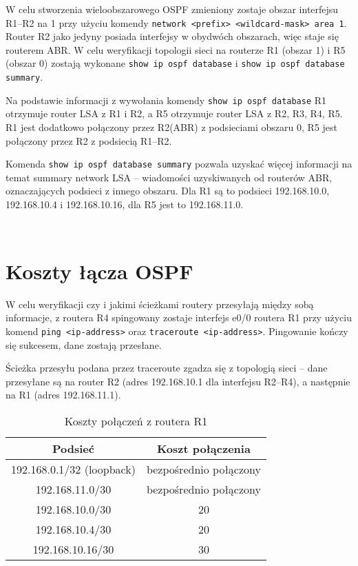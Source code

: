 \documentclass[a4paper,12pt,notitlepage]{article}
\begin{document}
W celu stworzenia wieloobszarowego OSPF zmieniony zostaje obszar interfejsu R1--R2 na 1 przy użyciu komendy \texttt{network <prefix> <wildcard-mask> area 1}. Router R2 jako jedyny posiada interfejsy w obydwóch obszarach, więc staje się routerem ABR. W celu weryfikacji topologii sieci na routerze R1 (obszar 1) i R5 (obszar 0) zostają wykonane \texttt{show ip ospf database} i \texttt{show ip ospf database summary}.

Na podstawie informacji z wywołania komendy \texttt{show ip ospf database} R1 otrzymuje router LSA z R1 i R2, a R5 otrzymuje router LSA z R2, R3, R4, R5. R1 jest dodatkowo połączony przez R2(ABR) z podsieciami obszaru 0, R5 jest połączony przez R2 z podsiecią R1--R2.

Komenda \texttt{show ip ospf database summary} pozwala uzyskać więcej informacji na temat summary network LSA -- wiadomości uzyskiwanych od routerów ABR, oznaczających podsieci z innego obszaru. Dla R1 są to podsieci 192.168.10.0, 192.168.10.4 i 192.168.10.16, dla R5 jest to 192.168.11.0.
\inputminted[label=Router R1, firstline=309, lastline=390]{text}{R1.txt}
\inputminted[label=Router R5, firstline=638, lastline=680]{text}{R5.txt}

\section{Koszty łącza OSPF}

W celu weryfikacji czy i jakimi ścieżkami routery przesyłają między sobą informacje, z routera R4 spingowany zostaje interfejs e0/0 routera R1 przy użyciu komend \texttt{ping <ip-address>} oraz \texttt{traceroute <ip-address>}. Pingowanie kończy się sukcesem, dane zostają przesłane.

Ścieżka przesyłu podana przez traceroute zgadza się z topologią sieci -- dane przesyłane są na router R2 (adres 192.168.10.1 dla interfejsu R2--R4), a następnie na R1 (adres 192.168.11.1).

\begin{table}[H]
    \caption{Koszty połączeń z routera R1}
    \label{tab:R1cost}
    \centering
    \begin{tabular}{*2c}
        \hline\hline
            \textbf{Podsieć} & \textbf{Koszt połączenia} \\
        \hline
            192.168.0.1/32 (loopback) & bezpośrednio połączony \\
            192.168.11.0/30 & bezpośrednio połączony \\
            192.168.10.0/30 & 20 \\
            192.168.10.4/30 & 20 \\
            192.168.10.16/30 & 30 \\
        \hline\hline
    \end{tabular}
\end{table}
\end{document}
